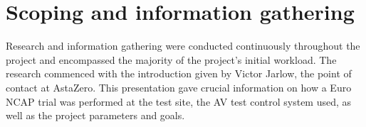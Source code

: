 \section{Scoping and information gathering}
Research and information gathering were conducted continuously throughout the project and encompassed the majority of the project's initial workload. The research commenced with the introduction given by Victor Jarlow, the point of contact at AstaZero. This presentation gave crucial information on how a Euro NCAP trial was performed at the test site, the AV test control system used, as well as the project parameters and goals.







